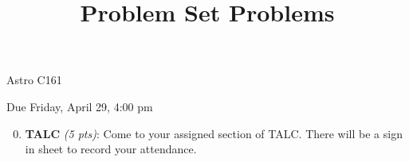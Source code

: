 \documentclass[12pt,preprint]{aastex}
\title{Problem Set Problems}
\def\K{\mathrm{K}}
\def\Tpl{T_{\mathrm{Pl}}}
\def\tpl{t_{\mathrm{Pl}}}
\begin{document}
\maketitle
\centerline{Astro C161} 

\centerline{Due Friday, April 29, 4:00 pm}

\begin{enumerate}
\setcounter{enumi}{-1}

\item \textbf{TALC} \textit{(5 pts)}: Come to your assigned section of TALC. There will be a sign in sheet to record your attendance.



\end{enumerate}
\end{document}
